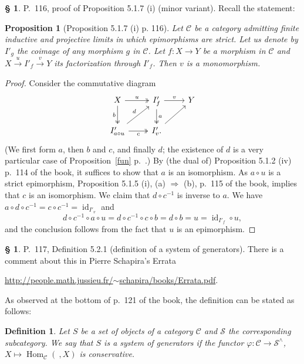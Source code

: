 \documentclass[12pt]{article}%
\newtheorem{prop}[thm]{Proposition}
\newtheorem{df}[thm]{Definition}%
\theoremstyle{remark}
\theoremstyle{definition}
\newtheorem{s}[thm]{\S}%
\newcommand{\cc}{\mathcal}
\newcommand{\C}{\mathcal C}
\newcommand{\pp}{\varphi}
\newcommand{\then}{\Rightarrow}
\newcommand{\xr}{\xrightarrow}
\DeclareMathOperator{\id}{id}
\DeclareMathOperator{\Hom}{Hom}%
\begin{document}
\begin{s} 
P.~116, proof of Proposition 5.1.7 (i) (minor variant). Recall the statement: 

\begin{prop}[Proposition 5.1.7 (i) p. 116]
Let $\C$ be a category admitting finite inductive and projective limits in which epimorphisms are strict. Let us denote by $I'_g$ the coimage of any morphism $g$ in $\C$. Let $f:X\to Y$ be a morphism in $\C$ and $X\xr u I'_f\xr v Y$ its factorization through $I'_f$. Then $v$ is a monomorphism. 
\end{prop}

\begin{proof}
Consider the commutative diagram
$$
\begin{tikzcd}
X\ar[two heads]{d}[swap]{b}\ar[two heads]{r}{u}&I'_f\ar[two heads]{d}{a}\ar{r}{v}&Y\\
I'_{a\circ u}\ar{ur}{d}\ar[two heads]{r}[swap]{c}&I'_v.\ar{ru}
\end{tikzcd}
$$ 
(We first form $a$, then $b$ and $c$, and finally $d$; the existence of $d$ is a very particular case of Proposition~\ref{fun} p.~\pageref{fun}.) By (the dual of) Proposition 5.1.2 (iv) p.~114 of the book, it suffices to show that $a$ is an isomorphism. As $a\circ u$ is a strict epimorphism, Proposition 5.1.5 (i), (a) $\then$ (b), p.~115 of the book, implies that $c$ is an isomorphism. We claim that $d\circ c^{-1}$ is inverse to $a$. We have $a\circ d\circ c^{-1}=c\circ c^{-1}=\id_{I'_v}$ and 
$$
d\circ c^{-1}\circ a\circ u=d\circ c^{-1}\circ c\circ b=d\circ b=u=\id_{I'_f}\circ u,
$$ 
and the conclusion follows from the fact that $u$ is an epimorphism.
\end{proof}
\end{s}

%

\begin{s}
P.~117, Definition 5.2.1 (definition of a system of generators). There is a comment about this in Pierre Schapira's Errata 

\href{http://people.math.jussieu.fr/~schapira/books/Errata.pdf}{http://people.math.jussieu.fr/$\sim$schapira/books/Errata.pdf}.

As observed at the bottom of p.~121 of the book, the definition can be stated as follows:

\begin{df}
Let $S$ be a set of objects of a category $\C$ and $\cc S$ the corresponding subcategory. We say that $S$ is a {\em system of generators}   if the functor $\pp:\C\to\cc S^\wedge$, $X\mapsto\Hom_\C(\ ,X)$ is conservative.
\end{df}
\end{s}
\end{document}

